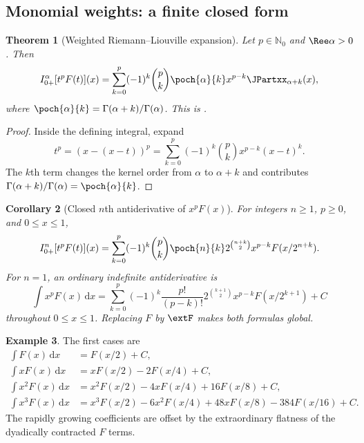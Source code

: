 \documentclass[11pt,oneside]{article}
\newtheorem{theorem}{Theorem}[section]
\newtheorem{corollary}[theorem]{Corollary}
\theoremstyle{definition}
\newtheorem{example}[theorem]{Example}
\theoremstyle{remark}
\newcommand{\N}{\mathbb N}
\newcommand{\dd}{\,\mathrm d}
\newcommand{\1}{\mathbf 1}
\begin{document}
\subsection{Monomial weights: a finite closed form}

\begin{theorem}[Weighted Riemann--Liouville expansion]
\label{p7:thm:weighted-RL}
Let $p\in\N_0$ and $\Ree\alpha>0$.  Then
\begin{equation}
 I_{0+}^{\alpha}[t^pF(t)](x)
 =\sum_{k=0}^{p}(-1)^k\binom pk\poch{\alpha}{k}
 x^{p-k}\JPartxx_{\alpha+k}(x),
 \label{p7:eq:weighted-RL}
\end{equation}
where $\poch{\alpha}{k}=\Gamma(\alpha+k)/\Gamma(\alpha)$.  This is \statusproved.
\end{theorem}

\begin{proof}
Inside the defining integral, expand
\[
 t^p=(x-(x-t))^p
 =\sum_{k=0}^p(-1)^k\binom pkx^{p-k}(x-t)^k.
\]
The $k$th term changes the kernel order from $\alpha$ to $\alpha+k$ and contributes
$\Gamma(\alpha+k)/\Gamma(\alpha)=\poch{\alpha}{k}$.
\end{proof}

\begin{corollary}[Closed $n$th antiderivative of $x^pF(x)$]
\label{p7:cor:nth-weighted-primitive}
For integers $n\ge1$, $p\ge0$, and $0\le x\le1$,
\begin{equation}
 I_{0+}^{n}[t^pF(t)](x)
 =\sum_{k=0}^{p}(-1)^k\binom pk\poch{n}{k}
 2^{\binom{n+k}{2}}x^{p-k}F(x/2^{n+k}).
 \label{p7:eq:nth-weighted-primitive}
\end{equation}
For $n=1$, an ordinary indefinite antiderivative is
\begin{equation}
 \boxed{
 \int x^pF(x)\dd x=
 \sum_{k=0}^{p}(-1)^k\frac{p!}{(p-k)!}
 2^{\binom{k+1}{2}}x^{p-k}F(x/2^{k+1})+C }
 \label{p7:eq:weighted-ordinary-antiderivative}
\end{equation}
throughout $0\le x\le1$.  Replacing $F$ by $\extF$ makes both formulas global.
\end{corollary}

\begin{example}
The first cases are
\begin{align*}
 \int F(x)\dd x&=F(x/2)+C,\\
 \int xF(x)\dd x&=xF(x/2)-2F(x/4)+C,\\
 \int x^2F(x)\dd x&=x^2F(x/2)-4xF(x/4)+16F(x/8)+C,\\
 \int x^3F(x)\dd x&=x^3F(x/2)-6x^2F(x/4)+48xF(x/8)-384F(x/16)+C.
\end{align*}
The rapidly growing coefficients are offset by the extraordinary flatness of the dyadically
contracted $F$ terms.
\end{example}
\end{document}
